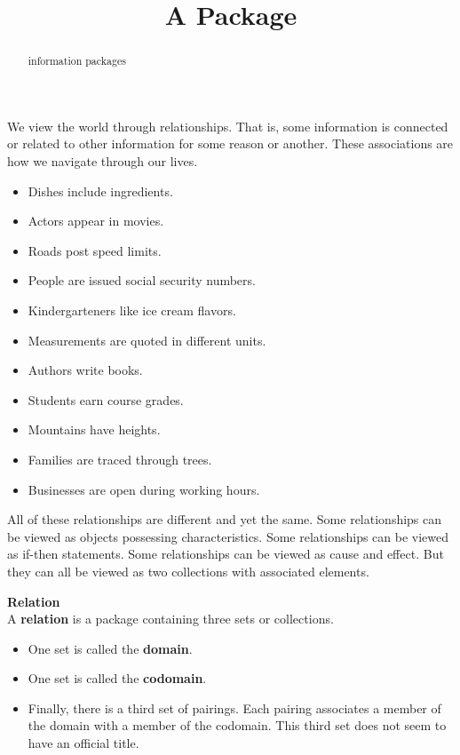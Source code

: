 \documentclass{ximera}
\title{A Package}
\begin{document}
\begin{abstract}
information packages
\end{abstract}
\maketitle


We view the world through relationships. That is, some information is connected or related to other information for some reason or another. These associations are how we navigate through our lives.

\begin{itemize}
\item Dishes include ingredients.
\item Actors appear in movies.
\item Roads post speed limits.
\item People are issued social security numbers.
\item Kindergarteners like ice cream flavors.
\item Measurements are quoted in different units.
\item Authors write books.
\item Students earn course grades.
\item Mountains have heights.
\item Families are traced through trees.
\item Businesses are open during working hours.
\end{itemize}


All of these relationships are different and yet the same.  Some relationships can be viewed as objects possessing characteristics. Some relationships can be viewed as if-then statements.  Some relationships can be viewed as cause and effect. But they can all be viewed as two collections with associated elements.







\begin{definition} \textbf{\textcolor{green!50!black}{Relation}} \\
A \textbf{relation} is a package containing three sets or collections. 


\begin{itemize}
\item One set is called the \textbf{\textcolor{purple!85!blue}{domain}}. 
\item One set is called the \textbf{\textcolor{purple!85!blue}{codomain}}.  
\item Finally, there is a third set of pairings.  Each pairing associates a member of the domain with a member of the codomain. This third set does not seem to have an official title.
\end{itemize}

\end{definition}
\end{document}
